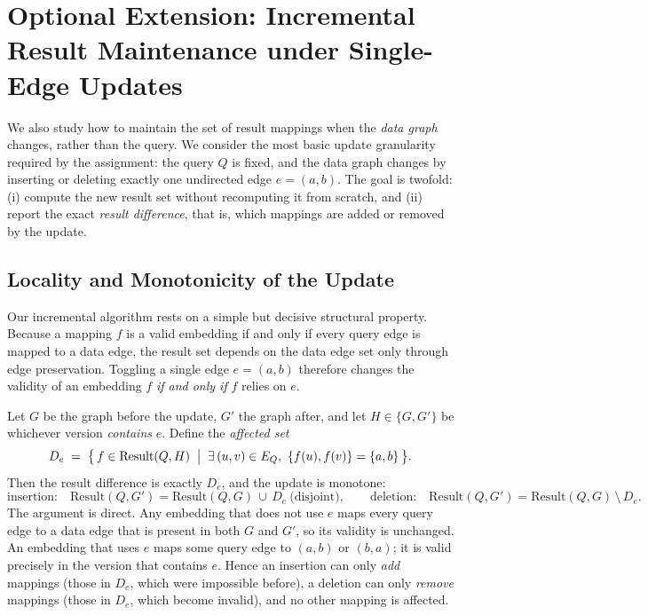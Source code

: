 \section{Optional Extension: Incremental Result Maintenance under Single-Edge Updates}
\label{sec:optional-dynamic}

We also study how to maintain the set of result mappings when the \emph{data graph} changes, rather than the query. We consider the most basic update granularity required by the assignment: the query $Q$ is fixed, and the data graph changes by inserting or deleting exactly one undirected edge $e = (a, b)$. The goal is twofold: (i) compute the new result set without recomputing it from scratch, and (ii) report the exact \emph{result difference}, that is, which mappings are added or removed by the update.

\subsection{Locality and Monotonicity of the Update}

Our incremental algorithm rests on a simple but decisive structural property. Because a mapping $f$ is a valid embedding if and only if every query edge is mapped to a data edge, the result set depends on the data edge set only through edge preservation. Toggling a single edge $e=(a,b)$ therefore changes the validity of an embedding $f$ \emph{if and only if} $f$ relies on $e$.

Let $G$ be the graph before the update, $G'$ the graph after, and let $H \in \{G, G'\}$ be whichever version \emph{contains} $e$. Define the \emph{affected set}
\[
D_e \;=\; \bigl\{\, f \in \mathrm{Result}(Q, H) \;\bigm|\; \exists\,(u,v)\in E_Q,\ \{f(u), f(v)\} = \{a, b\} \,\bigr\}.
\]
Then the result difference is exactly $D_e$, and the update is monotone:
\[
\text{insertion:}\quad \mathrm{Result}(Q, G') = \mathrm{Result}(Q, G) \,\cup\, D_e \ \text{(disjoint)}, \qquad
\text{deletion:}\quad \mathrm{Result}(Q, G') = \mathrm{Result}(Q, G) \,\setminus\, D_e .
\]
The argument is direct. Any embedding that does not use $e$ maps every query edge to a data edge that is present in both $G$ and $G'$, so its validity is unchanged. An embedding that uses $e$ maps some query edge to $(a,b)$ or $(b,a)$; it is valid precisely in the version that contains $e$. Hence an insertion can only \emph{add} mappings (those in $D_e$, which were impossible before), a deletion can only \emph{remove} mappings (those in $D_e$, which become invalid), and no other mapping is affected.

